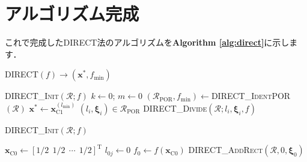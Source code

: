 ﻿\documentclass{jsarticle}
\begin{document}
\section{アルゴリズム完成}

これで完成したDIRECT法のアルゴリズムを\textbf{Algorithm \ref{alg:direct}}に示します．

\begin{algorithm}[tbh]
\caption{\textsc{DIRECT}$(f)\rightarrow(\bm{x}^{*},f_{\mathrm{min}})$}
\label{alg:direct}
\begin{algorithmic}[1]
\State \textsc{DIRECT\_Init}$(\mathcal{R};f)$
\State $k\leftarrow 0$; $m\leftarrow 0$
  \State $(\mathcal{R}_{\mathrm{POR}},f_{\mathrm{min}})\leftarrow$\textsc{DIRECT\_IdentPOR}$(\mathcal{R})$
    \State $\bm{x}^{*}\leftarrow\bm{x}^{(l_{\mathrm{min}})}_{\mathrm{C}1}$
    \State {}
  \EndIf
    \State $(l_{i},\bm{\xi}_{i})\in\mathcal{R}_{\mathrm{POR}}$
    \State \textsc{DIRECT\_Divide}$(\mathcal{R};l_{i},\bm{\xi}_{i},f)$
  \EndWhile
\EndWhile
\end{algorithmic}
\end{algorithm}

\begin{algorithm}[tbh]
\caption{\textsc{DIRECT\_Init}$(\mathcal{R};f)$}
\label{alg:direct_init}
\begin{algorithmic}[1]
\State $\bm{x}_{\mathrm{C}0}\leftarrow[1/2~~1/2~~\cdots~~1/2]^{\mathrm{T}}$
  \State $l_{0j}\leftarrow 0$
\EndFor
\State $f_{0}\leftarrow f(\bm{x}_{\mathrm{C}0})$
\State \textsc{DIRECT\_AddRect}$(\mathcal{R},0,\bm{\xi}_{0})$
\end{algorithmic}
\end{algorithm}
\end{document}
